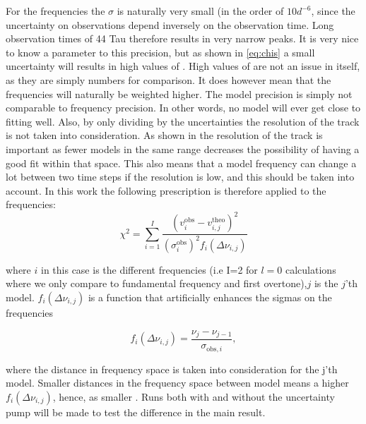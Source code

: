 For the frequencies the $\sigma$ is naturally very small (in the order of $10d^{-6}$, since the uncertainty on observations depend inversely on the observation time. Long observation times of 44 Tau therefore results in very narrow peaks. It is very nice to know a parameter to this precision, but as shown in \eqref{eq:chis} a small uncertainty will results in high values of \chis. High values of \chis are not an issue in itself, as they are simply numbers for comparison. It does however mean that the frequencies will naturally be weighted higher. The model precision is simply not comparable to frequency precision. In other words, no model will ever get close to fitting well. Also, by only dividing by the uncertainties the resolution of the track is not taken into consideration. As shown in  the resolution of the track is important as fewer models in the same range decreases the possibility of having a good fit within that space. This also means that a model frequency can change a lot between two time steps if the resolution is low, and this should be taken into account. In this work the following prescription is therefore applied to the frequencies: 
\begin{equation}
\label{sigma}
    \chi^2  = \sum^I_{i=1}\frac{\left(v^{\text{obs}}_{i}-v^{\text{theo}}_{i,j}\right)^2}{(\sigma^{\text{obs}}_i)^2 f_i(\Delta\nu_{i,j})}
\end{equation}

\noindent where $i$ in this case is the different frequencies (i.e I=2 for $l=0$ calculations where we only compare to fundamental frequency and first overtone),$j$ is the $j$'th model. $f_i(\Delta \nu_{i,j})$ is a function that artificially enhances the sigmas on the frequencies

\begin{equation}
\label{function}
    f_i(\Delta \nu_{i,j}) = \frac{\nu_j - \nu_{j-1}}{\sigma_{\text{obs},i}},
\end{equation}
 
\noindent where the distance in frequency space is taken into consideration for the j'th model. Smaller distances in the frequency space between model means a higher $f_i(\Delta \nu_{i,j})$, hence, as smaller \chis. Runs both with and without the uncertainty pump will be made to test the difference in the main result. 


